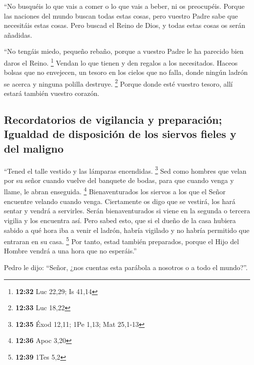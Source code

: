 \begin{paracol}{2}
 ``No busquéis lo que vais a comer o lo que vais a beber,
ni os preocupéis.  Porque las naciones del mundo buscan
todas estas cosas, pero vuestro Padre sabe que necesitáis estas cosas.
 Pero buscad el Reino de Dios, y todas estas cosas os
serán añadidas.

 ``No tengáis miedo, pequeño rebaño, porque a vuestro
Padre le ha parecido bien daros el Reino. \footnote{\textbf{12:32} Luc
  22,29; Is 41,14}  Vendan lo que tienen y den regalos a
los necesitados. Haceos bolsas que no envejecen, un tesoro en los cielos
que no falla, donde ningún ladrón se acerca y ninguna polilla destruye.
\footnote{\textbf{12:33} Luc 18,22}  Porque donde esté
vuestro tesoro, allí estará también vuestro corazón.

\hypertarget{recordatorios-de-vigilancia-y-preparaciuxf3n-igualdad-de-disposiciuxf3n-de-los-siervos-fieles-y-del-maligno}{%
\subsection{Recordatorios de vigilancia y preparación; Igualdad de
disposición de los siervos fieles y del
maligno}\label{recordatorios-de-vigilancia-y-preparaciuxf3n-igualdad-de-disposiciuxf3n-de-los-siervos-fieles-y-del-maligno}}

 ``Tened el talle vestido y las lámparas encendidas.
\footnote{\textbf{12:35} Éxod 12,11; 1Pe 1,13; Mat 25,1-13}
 Sed como hombres que velan por su señor cuando vuelve
del banquete de bodas, para que cuando venga y llame, le abran
enseguida. \footnote{\textbf{12:36} Apoc 3,20} 
Bienaventurados los siervos a los que el Señor encuentre velando cuando
venga. Ciertamente os digo que se vestirá, los hará sentar y vendrá a
servirles.  Serán bienaventurados si viene en la segunda
o tercera vigilia y los encuentra así.  Pero sabed esto,
que si el dueño de la casa hubiera sabido a qué hora iba a venir el
ladrón, habría vigilado y no habría permitido que entraran en su casa.
\footnote{\textbf{12:39} 1Tes 5,2}  Por tanto, estad
también preparados, porque el Hijo del Hombre vendrá a una hora que no
esperáis.''

 Pedro le dijo: ``Señor, ¿nos cuentas esta parábola a
nosotros o a todo el mundo?''.


\end{paracol}
